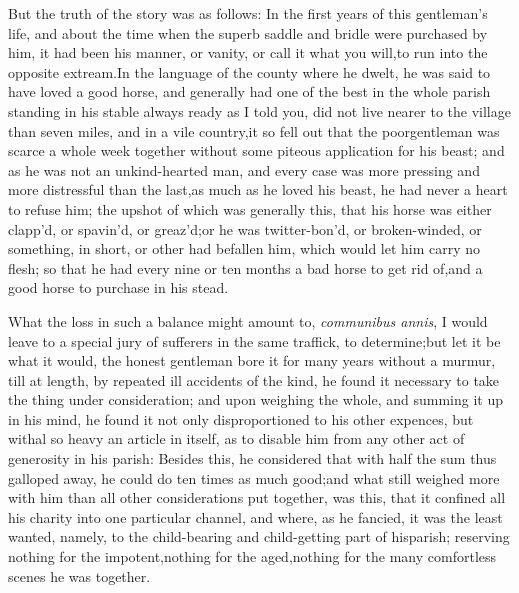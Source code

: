 \documentclass{article}
\begin{document}
But the truth of the story was as follows: In the first years of
this gentleman’s life, and about the time when the superb saddle
and bridle were purchased by him, it had been his manner, or
vanity, or call it what you will,\tsk  to run into the opposite
extream.\tsk  In the language of the county where he dwelt, he
was said to have loved a good horse, and generally had one of
the best in the whole parish standing in his stable always ready
\break
as I told you, did not
live nearer to the village than seven miles, and in a vile
country,\tsh  it so fell out that the poor\break gentleman was scarce
a whole week together without some piteous application for his
beast; and as he was not an un\-kind-hearted man, and every case
was more pressing and more distressful than the last,\tsk  as
much as he loved his beast, he had never a heart to refuse
him; the upshot of which was generally this, that his horse was
either clapp’d, or spavin’d, or greaz’d;\tsk  or he was
twitter-bon’d, or broken-winded, or something, in short, or
other had befallen him, which would let him carry no flesh;\tsk
so that he had every nine or ten months a bad horse to get rid
of,\tsk  and a good horse to purchase in his stead.

What the loss in such a balance might amount to, \textit{communibus
annis}, I would leave to a special jury of sufferers in the same traffick,
to determine;\tsk  but let it be what it would, the honest
gentleman bore it for many years without a murmur, till at length,
by repeated ill accidents of the kind, he found it necessary to
take the thing under consideration; and upon weighing the whole,
and summing it up in his mind, he found it not only disproportioned
to his other expences, but withal so heavy an article in itself, as
to disable him from any other act of generosity in his parish:
Besides this, he considered that with half the sum thus galloped
away, he could do ten times as much good;\tsk  and what still
weighed more with him than all other considerations put together,
was this, that it confined all his charity into one particular
channel, and where, as he fancied, it was the least wanted, namely,
to the child-bearing and child-getting part of his\break parish;
reserving nothing for the impotent,\tsk  nothing for the
aged,\tsk  nothing for the many comfortless scenes he was 
\break together.\\
\end{document}
